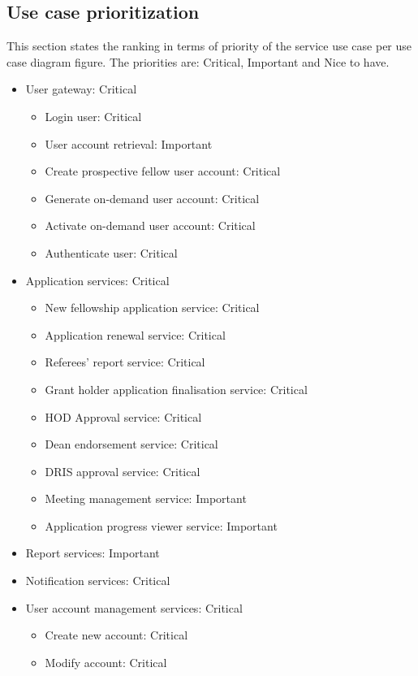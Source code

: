 \documentclass[12pt]{article}
\begin{document}
\subsection{Use case prioritization}
\vspace{0.2in}
This section states the ranking in terms of priority of the service use case per use case diagram figure. The priorities are: Critical, Important and Nice to have.\\ 
\begin{itemize}
	\item User gateway: Critical
	\begin{itemize}
		\item Login user: Critical
		\item User account retrieval: Important
		\item Create prospective fellow user account: Critical
		\item Generate on-demand user account: Critical
		\item Activate on-demand user account: Critical
		\item Authenticate user: Critical
	\end{itemize}
	\item Application services: Critical
	\begin{itemize}
		\item New fellowship application service: Critical
		\item Application renewal service: Critical
		\item Referees' report service: Critical
		\item Grant holder application finalisation service: Critical
		\item HOD Approval service: Critical
		\item Dean endorsement service: Critical
		\item DRIS approval service: Critical		
		\item Meeting management service: Important
		\item Application progress viewer service: Important
	\end{itemize}
	\item Report services: Important
	\item Notification services: Critical
	\item User account management services: Critical
	\begin{itemize}
		\item Create new account: Critical
		\item Modify account: Critical

\end{itemize}
\end{itemize}
\end{document}
